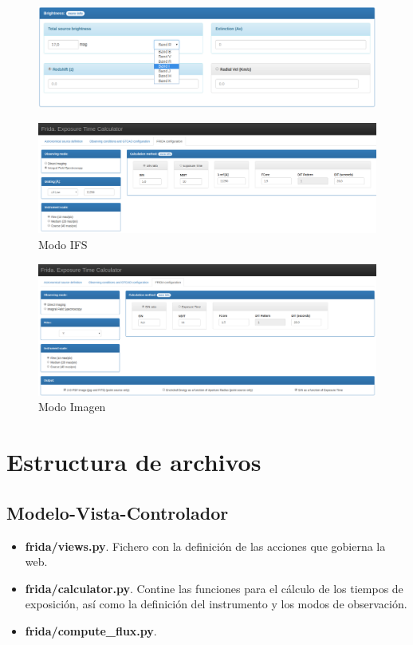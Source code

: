 \begin{figure}[h]
    \centering
    \includegraphics[scale=0.25]{figs/brightness}
    \label{fig:brightness}
\end{figure}
\begin{figure}[h]
    \centering
    \includegraphics[scale=0.2]{figs/ifs-mode}
    \caption{Modo IFS}
    \label{fig:ifs-mode}
\end{figure}
\begin{figure}[h]
    \centering
    \includegraphics[scale=0.2]{figs/image-mode}
    \caption{Modo Imagen}
    \label{fig:image-mode}
\end{figure}

\newpage
\section{Estructura de archivos}
    \subsection{Modelo-Vista-Controlador}
    \begin{itemize}
        \item \textbf{frida/views.py}. Fichero con la definición de las acciones que gobierna la web.
        \item \textbf{frida/calculator.py}. Contine las funciones para el c\'alculo de los tiempos de exposici\'on, as\'i como la definici\'on del instrumento y los modos de observaci\'on.
        \item \textbf{frida/compute\_flux.py}.
    \end{itemize}

